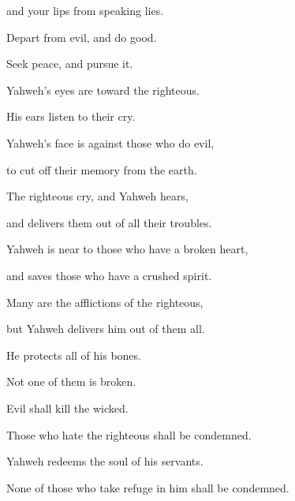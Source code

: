 {\par }{\QB and your lips from speaking lies.
\par }{\Q {}Depart from evil, and do good.
\par }{\QB Seek peace, and pursue it.
\par }{\Q {}Yahweh’s eyes are toward the righteous.
\par }{\QB His ears listen to their cry.
\par }{\Q {}Yahweh’s face is against those who do evil,
\par }{\QB to cut off their memory from the earth.
\par }{\Q {}The righteous cry, and Yahweh hears,
\par }{\QB and delivers them out of all their troubles.
\par }{\Q {}Yahweh is near to those who have a broken heart,
\par }{\QB and saves those who have a crushed spirit.
\par }{\Q {}Many are the afflictions of the righteous,
\par }{\QB but Yahweh delivers him out of them all.
\par }{\Q {}He protects all of his bones.
\par }{\QB Not one of them is broken.
\par }{\Q {}Evil shall kill the wicked.
\par }{\QB Those who hate the righteous shall be condemned.
\par }{\Q {}Yahweh redeems the soul of his servants.
\par }{\QB None of those who take refuge in him shall be condemned.

}
